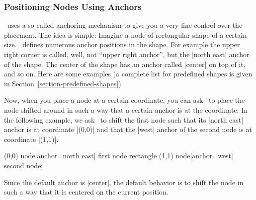 \subsubsection{Positioning Nodes Using Anchors}

\pgfname\ uses a so-called anchoring mechanism to give you a very fine control
over the placement. The idea is simple: Imagine a node of rectangular shape of
a certain size. \pgfname\ defines numerous anchor positions in the shape. For
example the upper right corner is called, well, not ``upper right anchor'', but
the |north east| anchor of the shape. The center of the shape has an anchor
called |center| on top of it, and so on. Here are some examples (a complete
list for predefined shapes is given in Section~\ref{section-predefined-shapes}).

\medskip\noindent
{}

Now, when you place a node at a certain coordinate, you can ask \tikzname\ to
place the node shifted around in such a way that a certain anchor is at the
coordinate. In the following example, we ask \tikzname\ to shift the first node
such that its  |north east| anchor is at coordinate |(0,0)| and that the |west|
anchor of the second node is at coordinate |(1,1)|.
%
\begin{codeexample}[]
\tikz \draw           (0,0) node[anchor=north east] {first node}
            rectangle (1,1) node[anchor=west] {second node};
\end{codeexample}

Since the default anchor is |center|, the default behavior is to shift the node
in such a way that it is centered on the current position.

